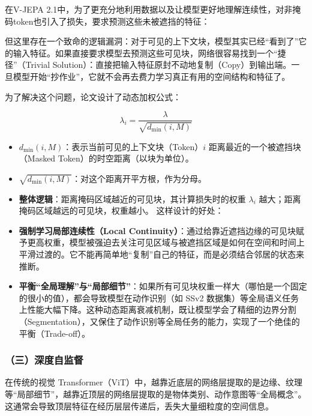 在V-JEPA 2.1中，为了更充分地利用数据以及让模型更好地理解连续性，对非掩码token也引入了损失，要求预测这些未被遮挡的特征：

但这里存在一个致命的逻辑漏洞：对于可见的上下文块，模型其实已经``看到了''它的输入特征。如果直接要求模型去预测这些可见块，网络很容易找到一个``捷径''（Trivial Solution）：直接把输入特征原封不动地复制（Copy）到输出端。一旦模型开始``抄作业''，它就不会再去费力学习真正有用的空间结构和特征了。

为了解决这个问题，论文设计了动态加权公式：

\[
\lambda_i = \frac{\lambda}{\sqrt{d_{\min}(i, M)}}
\]

\begin{itemize}
\item
  \(d_{\min}(i, M)\)：表示当前可见的上下文块（Token）\(i\) 距离最近的一个被遮挡块（Masked Token）的时空距离（以块为单位）。
\item
  \(\sqrt{d_{\min}(i, M)}\)：对这个距离开平方根，作为分母。
\item
  \textbf{整体逻辑}：距离掩码区域越近的可见块，其计算损失时的权重 \(\lambda_i\) 越大；距离掩码区域越远的可见块，权重越小。
  这样设计的好处：
\item
  \textbf{强制学习局部连续性（Local Continuity）}：通过给靠近遮挡边缘的可见块赋予更高权重，模型被强迫去关注可见区域与被遮挡区域是如何在空间和时间上平滑过渡的。它不能再简单地``复制''自己的特征，而是必须结合邻居的状态来推断。
\item
  \textbf{平衡``全局理解''与``局部细节''}：如果所有可见块权重一样大（哪怕是一个固定的很小的值），都会导致模型在动作识别（如 SSv2 数据集）等全局语义任务上性能大幅下降。这种动态距离衰减机制，既让模型学会了精细的边界分割（Segmentation），又保住了动作识别等全局任务的能力，实现了一个绝佳的平衡（Trade-off）。
\end{itemize}

\hypertarget{ux4e09ux6df1ux5ea6ux81eaux76d1ux7763}{%
\subsubsection{（三）深度自监督}\label{ux4e09ux6df1ux5ea6ux81eaux76d1ux7763}}

在传统的视觉 Transformer（ViT）中，越靠近底层的网络层提取的是边缘、纹理等``局部细节''，越靠近顶层的网络层提取的是物体类别、动作意图等``全局概念''。这通常会导致顶层特征在经历层层传递后，丢失大量细粒度的空间信息。

